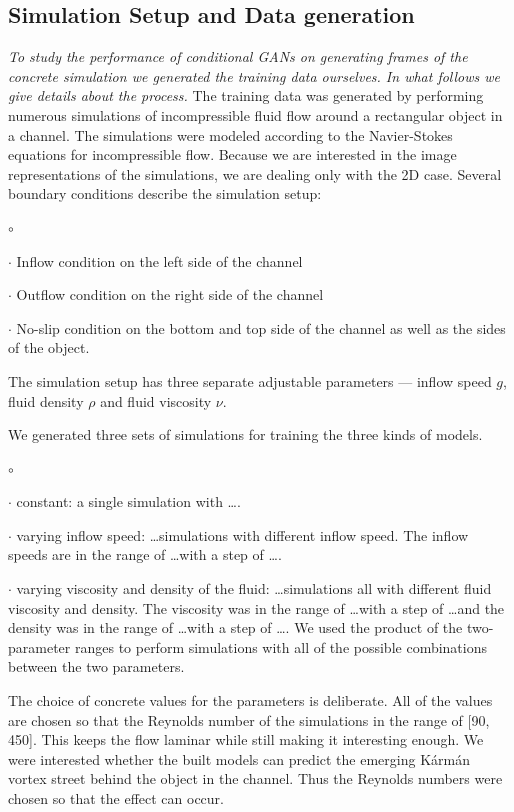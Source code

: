 \documentclass{llncs}
\begin{document}
\subsection{Simulation Setup and Data generation}
\emph{To study the performance of conditional GANs on generating frames of the concrete simulation we generated the training data ourselves. In what follows we give details about the process.} The training data was generated by performing numerous simulations of incompressible fluid flow around a rectangular object in a channel. The simulations were modeled according to the Navier-Stokes equations for incompressible flow. Because we are interested in the image representations of the simulations, we are dealing only with the 2D case. Several boundary conditions describe the simulation setup:
\begin{list}{$\circ$}{}
\item[$\cdot$] Inflow condition on the left side of the channel
\item[$\cdot$] Outflow condition on the right side of the channel
\item[$\cdot$] No-slip condition on the bottom and top side of the channel as well as the sides of the object.
\end{list}
The simulation setup has three separate adjustable parameters --- inflow speed $g$, fluid density $\rho$ and fluid viscosity $\nu$.

We generated three sets of simulations for training the three kinds of models.
\begin{list}{$\circ$}{}
\item[$\cdot$] constant: a single simulation with \ldots.
\item[$\cdot$] varying inflow speed: \ldots simulations with different inflow speed. The inflow speeds are in the range of \ldots with a step of \ldots.
\item[$\cdot$] varying viscosity and density of the fluid: \ldots simulations all with different fluid viscosity and density. The viscosity was in the range of \ldots with a step of \ldots and the density was in the range of \ldots with a step of \ldots. We used the product of the two-parameter ranges to perform simulations with all of the possible combinations between the two parameters.
\end{list}

The choice of concrete values for the parameters is deliberate. All of the values are chosen so that the Reynolds number of the simulations in the range of [90, 450]. This keeps the flow laminar while still making it interesting enough. We were interested whether the built models can predict the emerging Kármán vortex street behind the object in the channel. Thus the Reynolds numbers were chosen so that the effect can occur.
\end{document}
